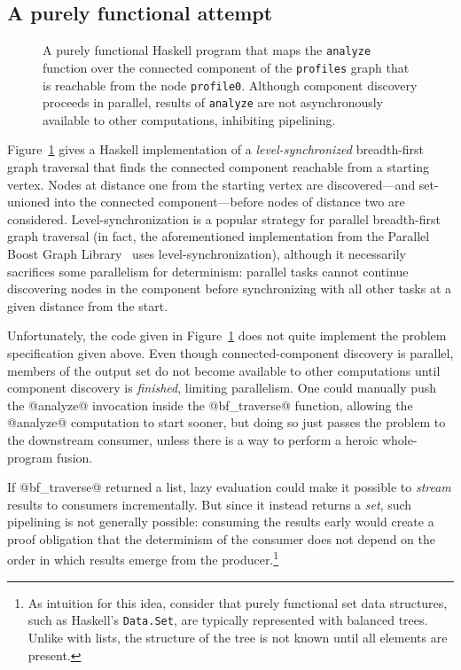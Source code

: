 \subsection{A purely functional attempt}

\begin{figure}
  
  \caption{A purely functional Haskell program that maps the
    \lstinline|analyze| function over the connected component of the
    \lstinline|profiles| graph that is reachable from the node
    \lstinline|profile0|.  Although component discovery proceeds in
    parallel, results of \lstinline|analyze| are not asynchronously
    available to other computations, inhibiting pipelining.}
  \label{f:bfs-pure}
\end{figure}

Figure~\ref{f:bfs-pure} gives a Haskell implementation of a
\emph{level-synchronized} breadth-first graph traversal that finds the
connected component reachable from a starting vertex.  Nodes at
distance one from the starting vertex are discovered---and set-unioned
into the connected component---before nodes of distance two are
considered.  Level-synchronization is a popular strategy for parallel
breadth-first graph traversal (in fact, the aforementioned
implementation from the Parallel Boost Graph Library~\cite{bfs-pbgl}
uses level-synchronization), although it necessarily sacrifices some
parallelism for determinism: parallel tasks cannot continue
discovering nodes in the component before synchronizing with all other
tasks at a given distance from the start.

Unfortunately, the code given in Figure~\ref{f:bfs-pure} does not
quite implement the problem specification given above.  Even though
connected-component discovery is parallel, members of the output set
do not become available to other computations until component
discovery is \emph{finished}, limiting parallelism.  One could
manually push the @analyze@ invocation inside the @bf_traverse@
function, allowing the @analyze@ computation to start sooner, but
doing so just passes the problem to the downstream consumer, unless
there is a way to perform a heroic whole-program fusion.

If @bf_traverse@ returned a list, lazy evaluation could make it
possible to \emph{stream} results to consumers incrementally.  But
since it instead returns a \emph{set}, such pipelining is not
generally possible: consuming the results early would create a proof
obligation that the determinism of the consumer does not depend on the
order in which results emerge from the producer.\footnote{As intuition
  for this idea, consider that purely functional set data structures,
  such as Haskell's \lstinline|Data.Set|, are typically represented
  with balanced trees.  Unlike with lists, the structure of the tree
  is not known until all elements are present.}

